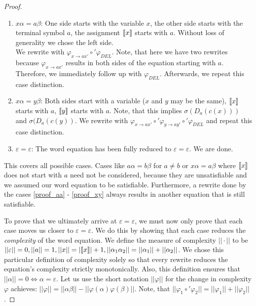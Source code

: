 \begin{proof}
\begin{enumerate}
    \item \label{proof_xa}
    $x\alpha = a\beta$: One side starts with the variable $x$, the other side starts with the terminal symbol $a$, the assignment $\llbracket x \rrbracket$ starts with $a$. Without loss of generality we chose the left side.\\
    We rewrite with $\varphi_{x \rightarrow ax'} \circ' \varphi_{DEL}$. Note, that here we have two rewrites because $\varphi_{x \rightarrow ax'}$ results in both sides of the equation starting with $a$. Therefore, we immediately follow up with $\varphi_{DEL}$. Afterwards, we repeat this case distinction.
    
    \item \label{proof_xy}
    $x\alpha = y\beta$: Both sides start with a variable ($x$ and $y$ may be the same), $\llbracket x \rrbracket$ starts with $a$, $\llbracket y \rrbracket$ starts with $a$. Note, that this implies $\sigma(D_a(c(x)))$ and $\sigma(D_a(c(y))$. We rewrite with $\varphi_{x \rightarrow ax'} \circ' \varphi_{y \rightarrow ay'} \circ' \varphi_{DEL}$ and repeat this case distinction.
    
    \item \label{proof_ee}
    $\varepsilon = \varepsilon$: The word equation has been fully reduced to $\varepsilon = \varepsilon$. We are done.
\end{enumerate}

This covers all possible cases. Cases like $a\alpha = b\beta$ for $a \neq b$ or $x\alpha = a\beta$ where $\llbracket x \rrbracket$ does not start with $a$ need not be considered, because they are unsatisfiable and we assumed our word equation to be satisfiable. Furthermore, a rewrite done by the cases \ref{proof_aa} - \ref{proof_xy} always results in another equation that is still satisfiable.

To prove that we ultimately arrive at $\varepsilon = \varepsilon$, we must now only prove that each case moves us closer to $\varepsilon = \varepsilon$. We do this by showing that each case reduces the \textit{complexity} of the word equation.
We define the measure of complexity $||\cdot||$ to be $||\varepsilon|| = 0, ||a|| = 1, ||x|| = |\llbracket x \rrbracket|+1, ||\alpha_1\alpha_2|| = ||\alpha_1|| + ||\alpha_2||$. We chose this particular definition of complexity solely so that every rewrite reduces the equation's complexity strictly monotonically. Also, this definition ensures that $||\alpha|| = 0 \Leftrightarrow \alpha = \varepsilon$. Let us use the short notation $||\varphi||$ for the change in complexity $\varphi$ achieves:
$||\varphi|| = ||\alpha\beta|| - ||\varphi(\alpha)\varphi(\beta)||$. Note, that $||\varphi_1 \circ' \varphi_2|| = ||\varphi_1|| + ||\varphi_2||$.


\end{proof}

